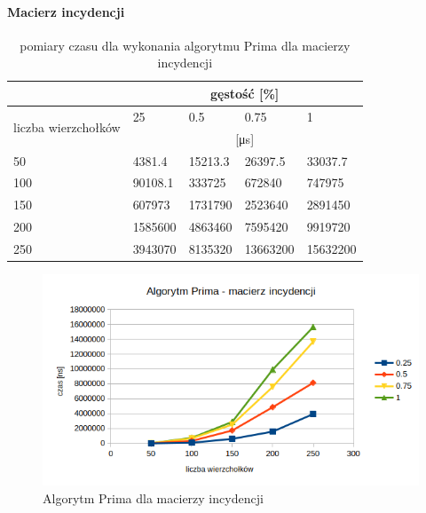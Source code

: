 \documentclass[11pt]{article}
\begin{document}
\paragraph{Macierz incydencji}
\begin{table}[H]
    \centering
    \begin{tabular}{|l|llll|}
        \hline
                                             & \multicolumn{4}{c|}{gęstość {[}\%{]}}                                                                           \\ \hline
        \multirow{2}{*}{liczba wierzchołków} & \multicolumn{1}{l|}{25}               & \multicolumn{1}{l|}{0.5}     & \multicolumn{1}{l|}{0.75}     & 1        \\ \cline{2-5}
                                             & \multicolumn{4}{c|}{[μs]}                                                                                       \\ \hline
        50                                   & \multicolumn{1}{l|}{4381.4}           & \multicolumn{1}{l|}{15213.3} & \multicolumn{1}{l|}{26397.5}  & 33037.7  \\ \hline
        100                                  & \multicolumn{1}{l|}{90108.1}          & \multicolumn{1}{l|}{333725}  & \multicolumn{1}{l|}{672840}   & 747975   \\ \hline
        150                                  & \multicolumn{1}{l|}{607973}           & \multicolumn{1}{l|}{1731790} & \multicolumn{1}{l|}{2523640}  & 2891450  \\ \hline
        200                                  & \multicolumn{1}{l|}{1585600}          & \multicolumn{1}{l|}{4863460} & \multicolumn{1}{l|}{7595420}  & 9919720  \\ \hline
        250                                  & \multicolumn{1}{l|}{3943070}          & \multicolumn{1}{l|}{8135320} & \multicolumn{1}{l|}{13663200} & 15632200 \\ \hline
    \end{tabular}
    \caption{pomiary czasu dla wykonania algorytmu Prima dla macierzy incydencji}
    \label{tab:my-table}
\end{table}
\begin{figure}[H]
    \includegraphics[width=13cm]{images/primmacierz.png}
    \caption{ Algorytm Prima dla    macierzy incydencji}
\end{figure}
\end{document}
